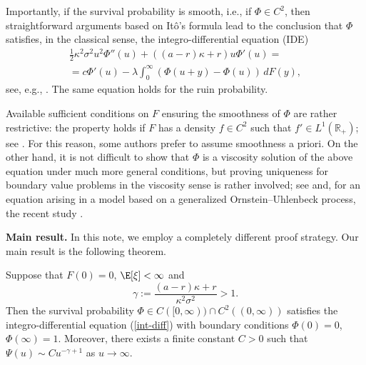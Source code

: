 Importantly, if the survival probability is smooth, i.e., if $\Phi \in C^2$, then straightforward arguments based on It\^o's formula lead to the conclusion that $\Phi$ satisfies, in the classical sense, the integro-differential equation (IDE)
\begin{multline}\label{int-diff}
\frac{1}{2} \kappa^2\sigma^2 u^2 \Phi''(u) + ((a-r)\kappa + r) u \Phi'(u) =
\\
= c \Phi'(u) - \lambda \int_0^\infty (\Phi(u+y) - \Phi(u)) \,dF(y),
\end{multline}
see, e.g., \cite{KP2016}. The same equation holds for the ruin probability.

Available sufficient conditions on $F$ ensuring the smoothness of $\Phi$ are rather restrictive: the property holds if $F$ has a density $f \in C^2$ such that $f' \in L^1(\mathbb{R}_+)$; see \cite{KPukh}. For this reason, some authors prefer to assume smoothness a priori. On the other hand, it is not difficult to show that $\Phi$ is a viscosity solution of the above equation under much more general conditions, but proving uniqueness for boundary value problems in the viscosity sense is rather involved; see \cite{Bel-Kab} and, for an equation arising in a model based on a generalized Ornstein--Uhlenbeck process, the recent study \cite{AK2025}.

\smallskip
\textbf{Main result.} 
In this note, we employ a completely different proof strategy. Our main result is the following theorem.

\begin{theorem}
\label{main}
Suppose that $F(0)=0$, $\E[\xi] < \infty$ and %
$$\gamma := \dfrac{(a-r)\kappa + r}{\kappa^2 \sigma^2} > 1.$$
Then the survival probability $\Phi \in C([0,\infty)) \cap C^2((0,\infty))$ satisfies the integro-differential equation (\ref{int-diff}) with boundary conditions $\Phi(0)=0$, $\Phi(\infty)=1$. Moreover, there exists a finite constant $C > 0$ such that $\Psi(u) \sim C u^{-\gamma+1}$ as $u \to \infty$.
\end{theorem}

